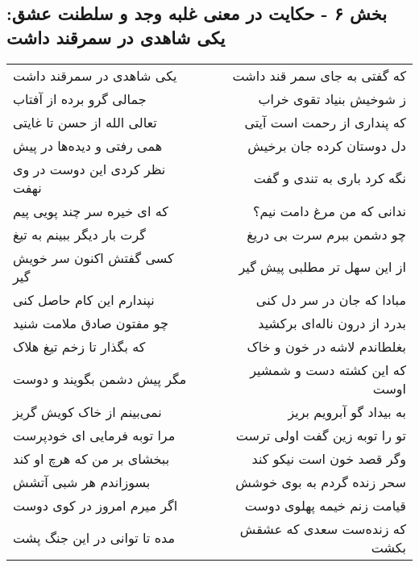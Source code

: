 \begin{center}
\section*{بخش ۶ - حکایت در معنی غلبه وجد و سلطنت عشق: یکی شاهدی در سمرقند داشت}
\label{sec:006}
\begin{longtable}{l p{0.5cm} r}
یکی شاهدی در سمرقند داشت
&&
که گفتی به جای سمر قند داشت
\\
جمالی گرو برده از آفتاب
&&
ز شوخیش بنیاد تقوی خراب
\\
تعالی الله از حسن تا غایتی
&&
که پنداری از رحمت است آیتی
\\
همی رفتی و دیده‌ها در پیش
&&
دل دوستان کرده جان برخیش
\\
نظر کردی این دوست در وی نهفت
&&
نگه کرد باری به تندی و گفت
\\
که ای خیره سر چند پویی پیم
&&
ندانی که من مرغ دامت نیم؟
\\
گرت بار دیگر ببینم به تیغ
&&
چو دشمن ببرم سرت بی دریغ
\\
کسی گفتش اکنون سر خویش گیر
&&
از این سهل تر مطلبی پیش گیر
\\
نپندارم این کام حاصل کنی
&&
مبادا که جان در سر دل کنی
\\
چو مفتون صادق ملامت شنید
&&
بدرد از درون ناله‌ای برکشید
\\
که بگذار تا زخم تیغ هلاک
&&
بغلطاندم لاشه در خون و خاک
\\
مگر پیش دشمن بگویند و دوست
&&
که این کشته دست و شمشیر اوست
\\
نمی‌بینم از خاک کویش گریز
&&
به بیداد گو آبرویم بریز
\\
مرا توبه فرمایی ای خودپرست
&&
تو را توبه زین گفت اولی ترست
\\
ببخشای بر من که هرچ او کند
&&
وگر قصد خون است نیکو کند
\\
بسوزاندم هر شبی آتشش
&&
سحر زنده گردم به بوی خوشش
\\
اگر میرم امروز در کوی دوست
&&
قیامت زنم خیمه پهلوی دوست
\\
مده تا توانی در این جنگ پشت
&&
که زنده‌ست سعدی که عشقش بکشت
\\
\end{longtable}
\end{center}
